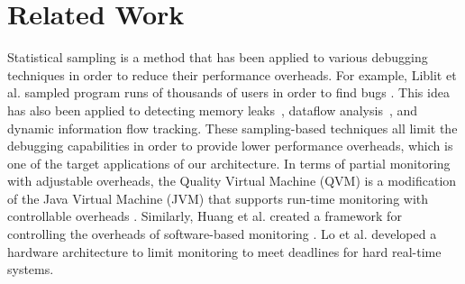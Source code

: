 \section{Related Work}
\label{sec:related}


 

Statistical sampling is a method that has been applied to various debugging
techniques in order to reduce their performance overheads. For example, Liblit
et al. sampled program runs of thousands of users in order to find bugs
\cite{liblit-pldi05}. This idea has also been applied to detecting memory
leaks~\cite{chilimbi-asplos04}, dataflow analysis~\cite{greathouse-cgo11}, and
dynamic information flow tracking\cite{testudo-micro08}.
These sampling-based techniques all limit the debugging capabilities in order
to provide lower performance overheads, which is one of the target applications of our architecture.
In terms of partial monitoring with adjustable overheads, the Quality Virtual Machine (QVM) is a
modification of the Java Virtual Machine (JVM) that supports run-time
monitoring with controllable overheads \cite{qvm-oopsla08}. Similarly, Huang et
al. created a framework for controlling the overheads of software-based
monitoring \cite{huang-sttt12}. 
Lo et al. \cite{lo-rtas14} developed a hardware architecture to limit
monitoring to meet deadlines for hard real-time systems.

